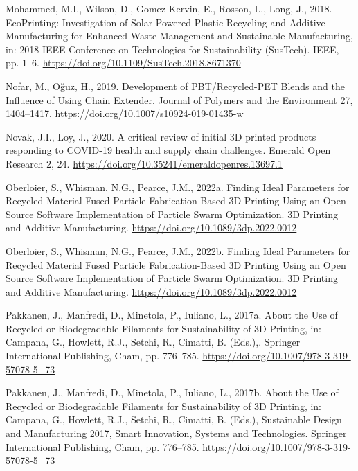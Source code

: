 \documentclass[
  12pt,
  number,
  review]{elsarticle}
\newlength{\cslhangindent}
\newlength{\cslentryspacingunit} %
\newenvironment{CSLReferences}[2] %
 {%
  \setlength{\parindent}{0pt}
  \ifodd #1
  \let\oldpar\par
  \def\par{\hangindent=\cslhangindent\oldpar}
  \fi
  \setlength{\parskip}{#2\cslentryspacingunit}
 }%
 {}
\begin{document}
\begin{CSLReferences}{1}{0}
\leavevmode{}%
Mohammed, M.I., Wilson, D., Gomez-Kervin, E., Rosson, L., Long, J.,
2018. {EcoPrinting}: {Investigation} of {Solar Powered Plastic
Recycling} and {Additive Manufacturing} for {Enhanced Waste Management}
and {Sustainable Manufacturing}, in: 2018 {IEEE Conference} on
{Technologies} for {Sustainability} ({SusTech}). {IEEE}, pp. 1--6.
\url{https://doi.org/10.1109/SusTech.2018.8671370}

\leavevmode{}%
Nofar, M., Oğuz, H., 2019. Development of {PBT}/{Recycled-PET Blends}
and the {Influence} of {Using Chain Extender}. Journal of Polymers and
the Environment 27, 1404--1417.
\url{https://doi.org/10.1007/s10924-019-01435-w}

\leavevmode{}%
Novak, J.I., Loy, J., 2020. A critical review of initial {3D} printed
products responding to {COVID-19} health and supply chain challenges.
Emerald Open Research 2, 24.
\url{https://doi.org/10.35241/emeraldopenres.13697.1}

\leavevmode{}%
Oberloier, S., Whisman, N.G., Pearce, J.M., 2022a. Finding {Ideal
Parameters} for {Recycled Material Fused Particle Fabrication-Based 3D
Printing Using} an {Open Source Software Implementation} of {Particle
Swarm Optimization}. 3D Printing and Additive Manufacturing.
\url{https://doi.org/10.1089/3dp.2022.0012}

\leavevmode{}%
Oberloier, S., Whisman, N.G., Pearce, J.M., 2022b. Finding {Ideal
Parameters} for {Recycled Material Fused Particle Fabrication-Based 3D
Printing Using} an {Open Source Software Implementation} of {Particle
Swarm Optimization}. 3D Printing and Additive Manufacturing.
\url{https://doi.org/10.1089/3dp.2022.0012}

\leavevmode{}%
Pakkanen, J., Manfredi, D., Minetola, P., Iuliano, L., 2017a. About the
{Use} of {Recycled} or {Biodegradable Filaments} for {Sustainability} of
{3D Printing}, in: Campana, G., Howlett, R.J., Setchi, R., Cimatti, B.
(Eds.),. {Springer International Publishing}, {Cham}, pp. 776--785.
\url{https://doi.org/10.1007/978-3-319-57078-5_73}

\leavevmode{}%
Pakkanen, J., Manfredi, D., Minetola, P., Iuliano, L., 2017b. About the
{Use} of {Recycled} or {Biodegradable Filaments} for {Sustainability} of
{3D Printing}, in: Campana, G., Howlett, R.J., Setchi, R., Cimatti, B.
(Eds.), Sustainable {Design} and {Manufacturing} 2017, Smart
{Innovation}, {Systems} and {Technologies}. {Springer International
Publishing}, {Cham}, pp. 776--785.
\url{https://doi.org/10.1007/978-3-319-57078-5_73}


\end{CSLReferences}
\end{document}
